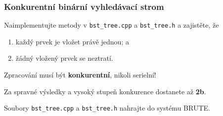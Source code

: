 \documentclass[usenames,dvipsnames,9pt]{beamer}
\begin{document}
\begin{frame}
  \frametitle{Konkurentní binární vyhledávací strom}
  Naimplementujte metody v \texttt{bst\_tree.cpp} a \texttt{bst\_tree.h} a zajistěte, že
  \begin{enumerate}
    \item každý prvek je vložet právě jednou; a
    \item žádný vložený prvek se neztratí.
  \end{enumerate}
  
  Zpracování musí být {\bf konkurentní}, nikoli serielní!
  
  \pause\vspace{1.5em}
  
  Za spravné výsledky a vysoký stupeň konkurence dostanete až {\bf 2b}.
  
    \pause\vspace{1.5em}

Soubory \texttt{bst\_tree.cpp} a \texttt{bst\_tree.h} nahrajte do systému BRUTE.
  

\end{frame}


\framefeedback{}
\end{document}
